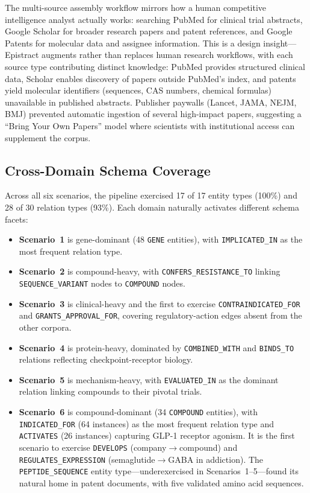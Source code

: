 The multi-source assembly workflow mirrors how a human competitive intelligence analyst actually works: searching PubMed for clinical trial abstracts, Google Scholar for broader research papers and patent references, and Google Patents for molecular data and assignee information. This is a design insight---Epistract augments rather than replaces human research workflows, with each source type contributing distinct knowledge: PubMed provides structured clinical data, Scholar enables discovery of papers outside PubMed's index, and patents yield molecular identifiers (sequences, CAS numbers, chemical formulas) unavailable in published abstracts. Publisher paywalls (Lancet, JAMA, NEJM, BMJ) prevented automatic ingestion of several high-impact papers, suggesting a ``Bring Your Own Papers'' model where scientists with institutional access can supplement the corpus.

\subsection{Cross-Domain Schema Coverage}
\label{sec:coverage}

Across all six scenarios, the pipeline exercised 17 of 17 entity types (100\%) and 28 of 30 relation types (93\%).
Each domain naturally activates different schema facets:

\begin{itemize}
  \item \textbf{Scenario~1} is gene-dominant (48 \texttt{GENE} entities), with \texttt{IMPLICATED\_IN} as the most frequent relation type.
  \item \textbf{Scenario~2} is compound-heavy, with \texttt{CONFERS\_RESISTANCE\_TO} linking \texttt{SEQUENCE\_VARIANT} nodes to \texttt{COMPOUND} nodes.
  \item \textbf{Scenario~3} is clinical-heavy and the first to exercise \texttt{CONTRAINDICATED\_FOR} and \texttt{GRANTS\_APPROVAL\_FOR}, covering regulatory-action edges absent from the other corpora.
  \item \textbf{Scenario~4} is protein-heavy, dominated by \texttt{COMBINED\_WITH} and \texttt{BINDS\_TO} relations reflecting checkpoint-receptor biology.
  \item \textbf{Scenario~5} is mechanism-heavy, with \texttt{EVALUATED\_IN} as the dominant relation linking compounds to their pivotal trials.
  \item \textbf{Scenario~6} is compound-dominant (34 \texttt{COMPOUND} entities), with \texttt{INDICATED\_FOR} (64 instances) as the most frequent relation type and \texttt{ACTIVATES} (26 instances) capturing GLP-1 receptor agonism. It is the first scenario to exercise \texttt{DEVELOPS} (company$\to$compound) and \texttt{REGULATES\_EXPRESSION} (semaglutide$\to$GABA in addiction). The \texttt{PEPTIDE\_SEQUENCE} entity type---underexercised in Scenarios~1--5---found its natural home in patent documents, with five validated amino acid sequences.
\end{itemize}

